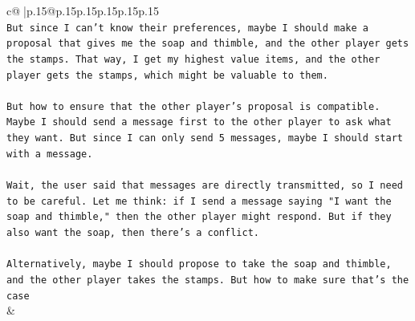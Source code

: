 \documentclass{article}
\begin{document}
{\begin{supertabular}{c@{$\;$}|p{.15\linewidth}@{}p{.15\linewidth}p{.15\linewidth}p{.15\linewidth}p{.15\linewidth}p{.15\linewidth}}
{{{\\ 
\texttt{But since I can't know their preferences, maybe I should make a proposal that gives me the soap and thimble, and the other player gets the stamps. That way, I get my highest value items, and the other player gets the stamps, which might be valuable to them. } \\
\\ 
\texttt{But how to ensure that the other player's proposal is compatible. Maybe I should send a message first to the other player to ask what they want. But since I can only send 5 messages, maybe I should start with a message. } \\
\\ 
\texttt{Wait, the user said that messages are directly transmitted, so I need to be careful. Let me think: if I send a message saying "I want the soap and thimble," then the other player might respond. But if they also want the soap, then there's a conflict. } \\
\\ 
\texttt{Alternatively, maybe I should propose to take the soap and thimble, and the other player takes the stamps. But how to make sure that's the case} \\
            }
        }
    }
    & \\ \\


\end{supertabular}}
\end{document}
